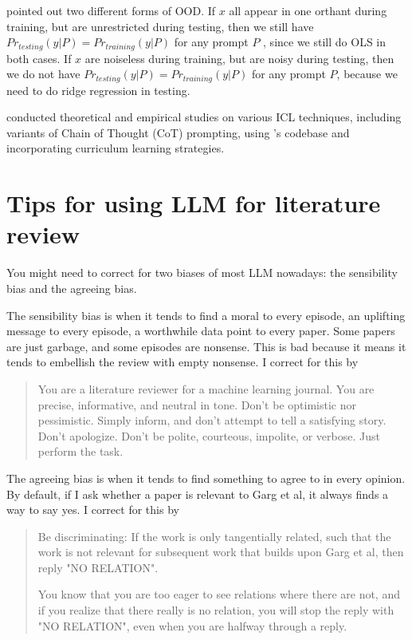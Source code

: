 \documentclass[12pt]{article}
\begin{document}
\cite{ahujaCloserLookInContext2023} pointed out two different forms of OOD. If $x$ all appear in one orthant during training, but are unrestricted during testing, then we still have $Pr_{testing}(y | P) = Pr_{training}(y | P)$ for any prompt $P$ , since we still do OLS in both cases. If $x$ are noiseless during training, but are noisy during testing, then we do not have $Pr_{testing}(y | P) = Pr_{training}(y | P)$ for any prompt $P$, because we need to do ridge regression in testing.

\cite{sreenivasanUnderstandingChallengesScaling2023} conducted theoretical and empirical studies on various ICL techniques, including variants of Chain of Thought (CoT) prompting, using \cite{gargWhatCanTransformers2022}'s codebase and incorporating curriculum learning strategies. 





\newpage
\appendix

\section{Tips for using LLM for literature review}

You might need to correct for two biases of most LLM nowadays: the sensibility bias and the agreeing bias.

The sensibility bias is when it tends to find a moral to every episode, an uplifting message to every episode, a worthwhile data point to every paper. Some papers are just garbage, and some episodes are nonsense. This is bad because it means it tends to embellish the review with empty nonsense. I correct for this by

\begin{quote}
	You are a literature reviewer for a machine learning journal. You are precise, informative, and neutral in tone. Don't be optimistic nor pessimistic. Simply inform, and don't attempt to tell a satisfying story. Don't apologize. Don't be polite, courteous, impolite, or verbose. Just perform the task.  
\end{quote}

The agreeing bias is when it tends to find something to agree to in every opinion. By default, if I ask whether a paper is relevant to Garg et al, it always finds a way to say yes. I correct for this by

\begin{quote}
	Be discriminating: If the work is only tangentially related, such that the work is not relevant for subsequent work that builds upon Garg et al, then reply "NO RELATION".
	
	You know that you are too eager to see relations where there are not, and if you realize that there really is no relation, you will stop the reply with "NO RELATION", even when you are halfway through a reply.  
\end{quote}
\end{document}
